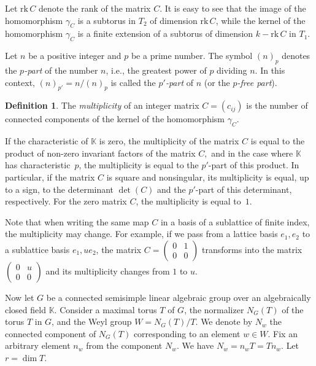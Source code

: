 \documentclass[a4paper,12pt]{amsart}
\theoremstyle{plain}
\theoremstyle{definition}
\newtheorem{definition}{Definition}
\newcommand{\KK}{\mathbb{K}}
\newcommand{\rk}{\mathrm{rk\,}}
\begin{document}
Let $\rk C$ denote the rank of the matrix $C$. It is easy to see that the image of the homomorphism $\gamma_C$ is a subtorus in $T_2$ of dimension $\rk C$, while the kernel of the homomorphism $\gamma_C$ is a finite extension of a subtorus of dimension $k-\rk C$ in $T_1$.

Let $n$ be a positive integer and $p$ be a prime number.
The symbol $(n)_p$ denotes the \emph{$p$-part} of the number $n$, i.e., the greatest power of $p$ dividing $n$. In this context, $(n)_{p'}=n/(n)_p$ is called the \emph{$p'$-part} of $n$ (or the \emph{$p$-free part}).

\begin{definition}
The \emph{multiplicity} of an integer matrix $C=(c_{ij})$ is the number of connected components of the kernel of the homomorphism $\gamma_C$.
\end{definition}

If the characteristic of $\KK$ is zero, the multiplicity of the matrix $C$ is equal to the product of non-zero invariant factors of the matrix $C,$ and in the case where $\KK$ has 
characteristic~$p$, the multiplicity is equal to the $p'$-part of this product. In particular, if the matrix $C$ is square and nonsingular, its multiplicity is equal, up to a sign, to the determinant $\det(C)$ and the $p'$-part of this determinant, respectively. For the zero matrix $C$, the multiplicity is equal to~$1$.

Note that when writing the same map $C$ in a basis of a sublattice of finite index, the multiplicity may change. For example, if we pass from a lattice basis $e_1,e_2$ to a sublattice basis $e_1, ue_2$, the matrix $C=\begin{pmatrix} 0 & 1 \\ 0 & 0 \end{pmatrix}$ transforms into the matrix $\begin{pmatrix} 0 & u \\ 0 & 0 \end{pmatrix}$ and its multiplicity changes from $1$ to $u$.

\medskip

Now let $G$ be a connected semisimple linear algebraic group over an algebraically closed field $\KK$. Consider a maximal torus $T$ of $G$, the normalizer $N_G(T)$ of the torus $T$ in $G$, and the Weyl group $W=N_G(T)/T$. We denote by $N_w$ the connected component of $N_G(T)$ corresponding to an element $w\in W$. Fix an arbitrary element $n_w$ from the component $N_w$. We have $N_w=n_wT=Tn_w$.
Let $r=\dim T$.
\end{document}
